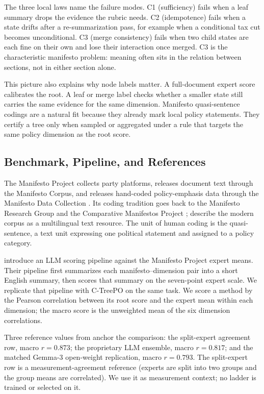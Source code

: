 The three local laws name the failure modes. C1 (sufficiency) fails
when a leaf summary drops the evidence the rubric needs. C2
(idempotence) fails when a state drifts after a re-summarization
pass, for example when a conditional tax cut becomes unconditional.
C3 (merge consistency) fails when two child states are each fine on
their own and lose their interaction once merged. C3 is the
characteristic manifesto problem: meaning often sits in the
relation between sections, not in either section alone.

This picture also explains why node labels matter. A full-document
expert score calibrates the root. A leaf or merge label checks
whether a smaller state still carries the same evidence for the
same dimension. Manifesto quasi-sentence codings are a natural fit
because they already mark local policy statements. They certify a
tree only when sampled or aggregated under a rule that targets the
same policy dimension as the root score.

\subsection{Benchmark, Pipeline, and References}
\label{sec:v8-benoit-benchmark}

The Manifesto Project collects party platforms, releases document
text through the Manifesto Corpus, and releases hand-coded
policy-emphasis data through the Manifesto Data Collection
\citep{ManifestoProject2025a,ManifestoCorpus2025}. Its coding
tradition goes back to the Manifesto Research Group and the
Comparative Manifestos Project
\citep{BudgeRobertsonHearl1987,BudgeEtAl2001,KlingemannEtAl2006,VolkensEtAl2013};
\citet{MerzEtAl2016} describe the modern corpus as a multilingual
text resource. The unit of human coding is the quasi-sentence, a
text unit expressing one political statement and assigned to a
policy category.

\citet{BenoitEtAl2025} introduce an LLM scoring pipeline against the
Manifesto Project expert means. Their pipeline first summarizes
each manifesto--dimension pair into a short English summary, then
scores that summary on the seven-point expert scale. We replicate
that pipeline with C-TreePO on the same task. We score a method by
the Pearson correlation between its root score and the expert mean
within each dimension; the macro score is the unweighted mean of
the six dimension correlations.

Three reference values from \citet{BenoitEtAl2025} anchor the
comparison: the split-expert agreement row, macro \(r=0.873\); the
proprietary LLM ensemble, macro \(r=0.817\); and the matched
Gemma-3 open-weight replication, macro \(r=0.793\). The split-expert
row is a measurement-agreement reference (experts are split into
two groups and the group means are correlated). We use it as
measurement context; no ladder is trained or selected on it.


